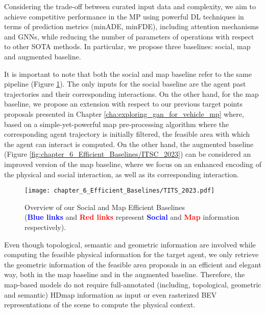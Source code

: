 Considering the trade-off between curated input data and complexity, we aim to achieve competitive performance in the \ac{MP} using powerful DL techniques in terms of prediction metrics (\ac{minADE}, \ac{minFDE}), including attention mechanisms and \acp{GNN}, while reducing the number of parameters of operations with respect to other \ac{SOTA} methods. In particular, we propose three baselines: social, map and augmented baseline. 

It is important to note that both the social and map baseline refer to the same pipeline (Figure \ref{fig:chapter_6_Efficient_Baselines/TITS_2023}). The only inputs for the social baseline are the agent past trajectories and their corresponding interactions. On the other hand, for the map baseline, we propose an extension with respect to our previous target points proposals presented in Chapter \ref{cha:exploring_gan_for_vehicle_mp} where, based on a simple-yet-powerful map pre-processing algorithm where the corresponding agent trajectory is initially filtered, the feasible area with which the agent can interact is computed. On the other hand, the augmented baseline (Figure \ref{fig:chapter_6_Efficient_Baselines/ITSC_2023}) can be considered an improved version of the map baseline, where we focus on an enhanced encoding of the physical and social interaction, as well as its corresponding interaction. 

\begin{figure}[!h]
	\centering
	\setlength{\tabcolsep}{2.0pt}
	\texttt{[image: chapter\_6\_Efficient\_Baselines/TITS\_2023.pdf]}
	\caption[Overview of our Social and Map Efficient Baselines]{Overview of our Social and Map Efficient Baselines \\ (\textbf{\textcolor{blue}{Blue links}} and \textbf{\textcolor{red}{Red links}} represent \textbf{\textcolor{blue}{Social}} and \textbf{\textcolor{red}{Map}} information respectively).}
	\label{fig:chapter_6_Efficient_Baselines/TITS_2023}
\end{figure}

Even though topological, semantic and geometric information are involved while computing the feasible physical information for the target agent, we only retrieve the geometric information of the feasible area proposals in an efficient and elegant way, both in the map baseline and in the augmented baseline. Therefore, the map-based models do not require full-annotated (including, topological, geometric and semantic) \ac{HDmap} information as input or even rasterized \ac{BEV} representations of the scene to compute the physical context. 


